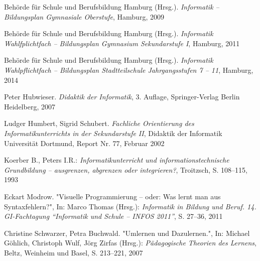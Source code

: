 \begin{thebibliography}{ABCDEF}
Behörde für Schule und Berufsbildung Hamburg (Hrsg.). \emph{Informatik -- Bildungsplan  Gymnasiale Oberstufe}, Hamburg, 2009

Behörde für Schule und Berufsbildung Hamburg (Hrsg.). \emph{Informatik Wahlfplichtfach -- Bildungsplan Gymnasium Sekundarstufe I}, Hamburg, 2011

Behörde für Schule und Berufsbildung Hamburg (Hrsg.). \emph{Informatik Wahlpflichtfach -- Bildungsplan Stadtteilschule Jahrgangsstufen 7 -- 11}, Hamburg, 2014

Peter Hubwieser. \emph{Didaktik der Informatik}, 3. Auflage, Springer-Verlag Berlin Heidelberg, 2007

Ludger Humbert, Sigrid Schubert. \emph{Fachliche Orientierung des Informatikunterrichts in der Sekundarstufe II}, Didaktik der Informatik Universität Dortmund, Report Nr. 77, Februar 2002

Koerber B., Peters I.R.: \emph{Informatikunterricht und informationstechnische Grundbildung –
ausgrenzen, abgrenzen oder integrieren?}, Troitzsch, S. 108--115, 1993 

Eckart Modrow. "{Visuelle Programmierung -- oder: Was lernt man aus Syntaxfehlern?}", In: Marco Thomas (Hrsg.): \emph{Informatik in Bildung und Beruf. 14. GI-Fachtagung "`Informatik und Schule – INFOS 2011"'}, S. 27--36, 2011

%




Christine Schwarzer, Petra Buchwald. "{Umlernen und Dazulernen}.", In: Michael Göhlich, Christoph Wulf, Jörg Zirfas (Hrsg.): \emph{Pädagogische Theorien des Lernens}, Beltz, Weinheim und Basel,  S. 213--221, 2007



\end{thebibliography}
